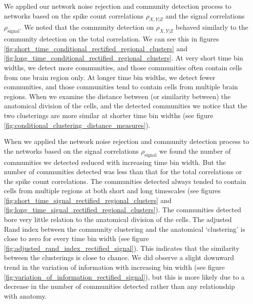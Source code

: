   We applied our network noise rejection and community detection process to networks based on the spike count correlations $\rho_{X,Y|Z}$ and the signal correlations $\rho_{\text{signal}}$. We noted that the community detection on $\rho_{X,Y|Z}$ behaved similarly to the community detection on the total correlation. We can see this  in figures \ref{fig:short_time_conditional_rectified_regional_clusters} and \ref{fig:long_time_conditional_rectified_regional_clusters}. At very short time bin widths, we detect more communities, and those communities often contain cells from one brain region only. At longer time bin widths, we detect fewer communities, and those communities tend to contain cells from multiple brain regions. When we examine the distance between (or similarity between) the anatomical division of the cells, and the detected communities we notice that the two clusterings are more similar at shorter time bin widths (see figure \ref{fig:conditional_clustering_distance_measures}).

  When we applied the network noise rejection and community detection process to the networks based on the signal correlations $\rho_{\text{signal}}$ we found the number of communities we detected reduced with increasing time bin width. But the number of communities detected was less than that for the total correlations or the spike count correlations. The communities detected always tended to contain cells from multiple regions at both short and long timescales (see figures \ref{fig:short_time_signal_rectified_regional_clusters} and \ref{fig:long_time_signal_rectified_regional_clusters}). The communities detected bore very little relation to the anatomical division of the cells. The adjusted Rand index between the community clustering and the anatomical `clustering' is close to zero for every time bin width (see figure \ref{fig:adjusted_rand_index_rectified_signal}). This indicates that the similarity between the clusterings is close to chance. We did observe a slight downward trend in the variation of information with increasing bin width (see figure \ref{fig:variation_of_information_rectified_signal}), but this is more likely due to a decrease in the number of communities detected rather than any relationship with anatomy.

